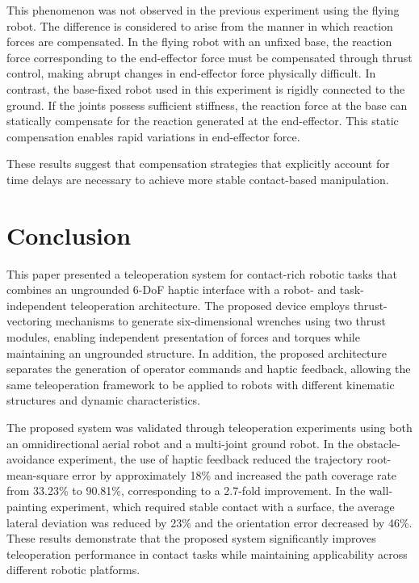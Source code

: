 \documentclass{WileyMSP-template}
\begin{document}
This phenomenon was not observed in the previous experiment using the flying robot. 
The difference is considered to arise from the manner in which reaction forces are compensated. 
In the flying robot with an unfixed base, the reaction force corresponding to the end-effector force must be compensated through thrust control, making abrupt changes in end-effector force physically difficult. 
In contrast, the base-fixed robot used in this experiment is rigidly connected to the ground. 
If the joints possess sufficient stiffness, the reaction force at the base can statically compensate for the reaction generated at the end-effector. 
This static compensation enables rapid variations in end-effector force.

These results suggest that compensation strategies that explicitly account for time delays are necessary to achieve more stable contact-based manipulation.

\section{Conclusion}
This paper presented a teleoperation system for contact-rich robotic tasks that combines an ungrounded 6-DoF haptic interface with a robot- and task-independent teleoperation architecture. 
The proposed device employs thrust-vectoring mechanisms to generate six-dimensional wrenches using two thrust modules, enabling independent presentation of forces and torques while maintaining an ungrounded structure. 
In addition, the proposed architecture separates the generation of operator commands and haptic feedback, allowing the same teleoperation framework to be applied to robots with different kinematic structures and dynamic characteristics.

The proposed system was validated through teleoperation experiments using both an omnidirectional aerial robot and a multi-joint ground robot. 
In the obstacle-avoidance experiment, the use of haptic feedback reduced the trajectory root-mean-square error by approximately 18\% and increased the path coverage rate from 33.23\% to 90.81\%, corresponding to a 2.7-fold improvement. 
In the wall-painting experiment, which required stable contact with a surface, the average lateral deviation was reduced by 23\% and the orientation error decreased by 46\%. 
These results demonstrate that the proposed system significantly improves teleoperation performance in contact tasks while maintaining applicability across different robotic platforms.
\end{document}
